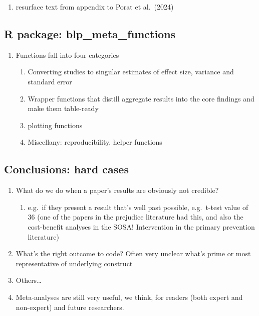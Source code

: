 \documentclass[
  man]{apa6}
\providecommand{\tightlist}{%
  \setlength{\itemsep}{0pt}\setlength{\parskip}{0pt}}
\begin{document}
\begin{enumerate}
\begin{enumerate}
    \begin{enumerate}
    \def\labelenumiii{\arabic{enumiii}.}
    \setcounter{enumiii}{6}
    \tightlist
    \item
      resurface text from appendix to Porat et al.~(2024)
    \end{enumerate}
  \end{enumerate}
\end{enumerate}

\subsection{R package: blp\_meta\_functions}\label{r-package-blp_meta_functions}

\begin{enumerate}
\def\labelenumi{\arabic{enumi}.}
\tightlist
\item
  Functions fall into four categories

  \begin{enumerate}
  \def\labelenumii{\arabic{enumii}.}
  \tightlist
  \item
    Converting studies to singular estimates of effect size, variance and standard error
  \item
    Wrapper functions that distill aggregate results into the core findings and make them table-ready
  \item
    plotting functions
  \item
    Miscellany: reproducibility, helper functions
  \end{enumerate}
\end{enumerate}

\subsection{Conclusions: hard cases}\label{conclusions-hard-cases}

\begin{enumerate}
\def\labelenumi{\arabic{enumi}.}
\tightlist
\item
  What do we do when a paper's results are obviously not credible?

  \begin{enumerate}
  \def\labelenumii{\arabic{enumii}.}
  \tightlist
  \item
    e.g.~if they present a result that's well past possible, e.g.~t-test value of 36 (one of the papers in the prejudice literature had this, and also the cost-benefit analyses in the SOSA! Intervention in the primary prevention literature)
  \end{enumerate}
\item
  What's the right outcome to code? Often very unclear what's prime or most representative of underlying construct
\item
  Others\ldots{}
\item
  Meta-analyses are still very useful, we think, for readers (both expert and non-expert) and future researchers.
\end{enumerate}
\end{document}
